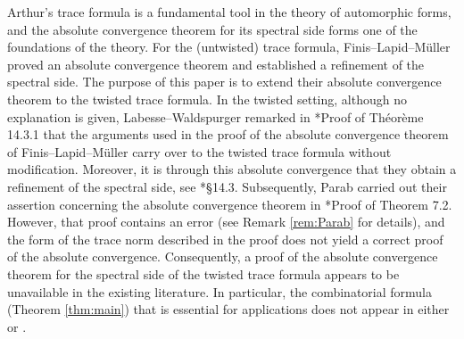 \documentclass[12pt]{amsart}
\theoremstyle{definition}
\theoremstyle{plain}
\theoremstyle{remark}
\numberwithin{equation}{section}
\begin{document}
Arthur's trace formula is a fundamental tool in the theory of automorphic forms, and the absolute convergence theorem for its spectral side forms one of the foundations of the theory.
For the (untwisted) trace formula, Finis--Lapid--M\"uller \cite{FLM11} proved an absolute convergence theorem and established a refinement of the spectral side. 
The purpose of this paper is to extend their absolute convergence theorem to the twisted trace formula.
In the twisted setting, although no explanation is given, Labesse--Waldspurger remarked in \cite{LW13}*{Proof of Th\'eor\`eme 14.3.1} that the arguments used in the proof of the absolute convergence theorem of Finis--Lapid--M\"uller carry over to the twisted trace formula without modification.
Moreover, it is through this absolute convergence that they obtain a refinement of the spectral side, see \cite{LW13}*{\S14.3}.
Subsequently, Parab carried out their assertion concerning the absolute convergence theorem in \cite{Par19}*{Proof of Theorem 7.2}.
However, that proof contains an error (see Remark \ref{rem:Parab} for details), and the form of the trace norm described in the proof does not yield a correct proof of the absolute convergence. 
Consequently, a proof of the absolute convergence theorem for the spectral side of the twisted trace formula appears to be unavailable in the existing literature.
In particular, the combinatorial formula (Theorem \ref{thm:main}) that is essential for applications does not appear in either \cite{LW13} or \cite{Par19}.
\end{document}
